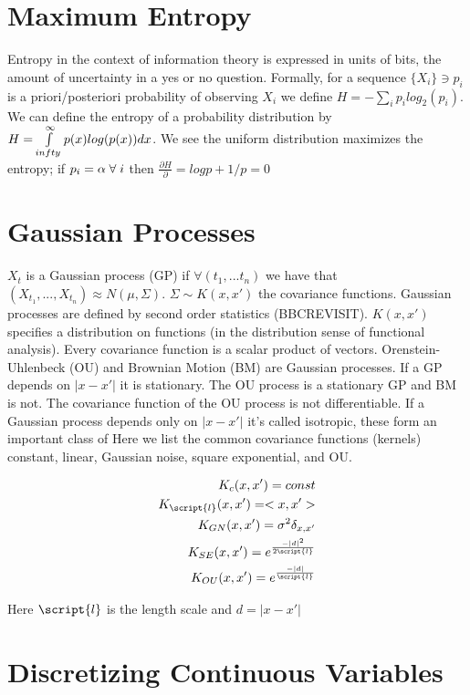 \section*{Maximum Entropy}
Entropy in the context of information theory is expressed in units of bits, the amount of uncertainty in a yes or no question. Formally, for a sequence $ \{X_i\} \ni p_i  $ is a priori/posteriori probability of observing $X_i$ we define $H=- \sum\limits_{i} p_i log_2( p_i) $.  We can define the entropy of a probability distribution by $H=\int\limits_{\-infty}^{\infty} p(x) log( p(x) ) dx $.  We see the uniform distribution maximizes the entropy; if $p_i=\alpha \; \forall \; i$ then $\frac{\partial H}{\partial } = log p +1/p=0 $

\section*{Gaussian Processes}
$X_t$ is a Gaussian process (GP) if $\forall (t_1,...t_n)$ we have that $(X_{t_1}, ... ,X_{t_n}) \approx N(\mu, \Sigma)$. $\Sigma \sim K(x,x')$ the covariance functions.  Gaussian processes are defined by second order statistics (BBCREVISIT). $K(x,x')$ specifies a distribution on functions (in the distribution sense of functional analysis). Every covariance function is a scalar product of vectors.  Orenstein-Uhlenbeck (OU) and Brownian Motion (BM) are Gaussian processes. If a GP depends on $|x-x'|$ it is stationary.  The OU process is a stationary GP and BM is not. The covariance function of the OU process is not differentiable.  If a Gaussian process depends only on $|x-x'|$ it's called isotropic, these form an important class of
Here we list the common covariance functions (kernels) constant, linear, Gaussian noise, square exponential, and OU.
\begin{center}\begin{eqnarray*}
K_c(x,x')= const \\
K_\script{l}(x,x') = <x,x'> \\
K_{GN}(x,x') = \sigma^2 \delta_{x,x'} \\
K_{SE}(x,x') = e^{ \frac{-|d|^2}{2 \script{l}} }\\
K_{OU}(x,x') = e^{ \frac{-|d|}{\script{l}} }
\end{eqnarray*}\end{center}
Here $\script{l}$ is the length scale and $d = |x-x'|$ 

\section*{Discretizing Continuous Variables}


